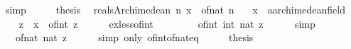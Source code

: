 \begin{isabellebody}
\ simp\isanewline
\ \ \isamarkupfalse%
\ \isamarkupfalse%
\ {\isacharquery}{\kern0pt}thesis\ \isacommand{{\isachardot}{\kern0pt}{\isachardot}{\kern0pt}}\isamarkupfalse%
\isanewline
{}\isamarkupfalse%
%
\endisatagproof
{\isafoldproof}%
%
\isadelimproof
\isanewline
%
\endisadelimproof
\isanewline
{}\isamarkupfalse%
\ reals{\isacharunderscore}{\kern0pt}Archimedean{}{\isacharcolon}{\kern0pt}\ {\isachardoublequoteopen}{\isasymexists}n{\isachardot}{\kern0pt}\ x\ {\isacharless}{\kern0pt}\ of{\isacharunderscore}{\kern0pt}nat\ n{\isachardoublequoteclose}\isanewline
\ \ \ x\ {\isacharcolon}{\kern0pt}{\isacharcolon}{\kern0pt}\ {\isachardoublequoteopen}{\isacharprime}{\kern0pt}a{\isacharcolon}{\kern0pt}{\isacharcolon}{\kern0pt}archimedean{\isacharunderscore}{\kern0pt}field{\isachardoublequoteclose}\isanewline
%
\isadelimproof
%
\endisadelimproof
%
\isatagproof
{}\isamarkupfalse%
\ {\isacharminus}{\kern0pt}\isanewline
\ \ \isamarkupfalse%
\ z\ \ {\isachardoublequoteopen}x\ {\isacharless}{\kern0pt}\ of{\isacharunderscore}{\kern0pt}int\ z{\isachardoublequoteclose}\isanewline
\ \ \ \ \isamarkupfalse%
\ ex{\isacharunderscore}{\kern0pt}less{\isacharunderscore}{\kern0pt}of{\isacharunderscore}{\kern0pt}int\ \isacommand{{\isachardot}{\kern0pt}{\isachardot}{\kern0pt}}\isamarkupfalse%
\isanewline
\ \ \isamarkupfalse%
\ \isamarkupfalse%
\ {\isachardoublequoteopen}{\isasymdots}\ {\isasymle}\ of{\isacharunderscore}{\kern0pt}int\ {\isacharparenleft}{\kern0pt}int\ {\isacharparenleft}{\kern0pt}nat\ z{\isacharparenright}{\kern0pt}{\isacharparenright}{\kern0pt}{\isachardoublequoteclose}\isanewline
\ \ \ \ \isamarkupfalse%
\ simp\isanewline
\ \ \isamarkupfalse%
\ \isamarkupfalse%
\ {\isachardoublequoteopen}{\isasymdots}\ {\isacharequal}{\kern0pt}\ of{\isacharunderscore}{\kern0pt}nat\ {\isacharparenleft}{\kern0pt}nat\ z{\isacharparenright}{\kern0pt}{\isachardoublequoteclose}\isanewline
\ \ \ \ \isamarkupfalse%
\ {\isacharparenleft}{\kern0pt}simp\ only{\isacharcolon}{\kern0pt}\ of{\isacharunderscore}{\kern0pt}int{\isacharunderscore}{\kern0pt}of{\isacharunderscore}{\kern0pt}nat{\isacharunderscore}{\kern0pt}eq{\isacharparenright}{\kern0pt}\isanewline
\ \ \isamarkupfalse%
\ \isamarkupfalse%
\ {\isacharquery}{\kern0pt}thesis\ \isacommand{{\isachardot}{\kern0pt}{\isachardot}{\kern0pt}}\isamarkupfalse%

\end{isabellebody}
